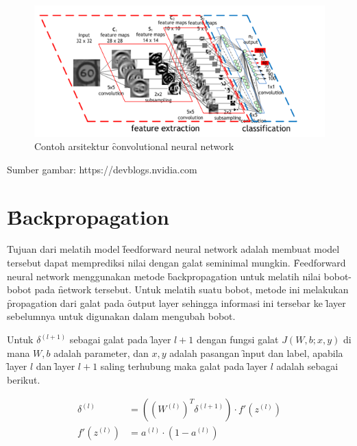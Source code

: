 \begin{figure}
	\centering
	\includegraphics[width=1\textwidth,height=0.45\textwidth]
	{pics/cnnlayers.png}
	\caption{Contoh arsitektur \f{convolutional neural network}}
	\label{fig:cnnlayers}
\end{figure}
\vspace{-1.2cm}
\begin{center}
	{\small Sumber gambar: https://devblogs.nvidia.com}
\end{center}
\section{\f{Backpropagation}}
Tujuan dari melatih model \f{feedforward neural network} adalah membuat model tersebut dapat memprediksi nilai dengan galat seminimal mungkin. \f{Feedforward neural network} menggunakan metode \f{backpropagation} untuk melatih nilai bobot-bobot pada \f{network} tersebut. Untuk melatih suatu bobot, metode ini melakukan \f{propagation} dari galat pada \f{output layer} sehingga informasi ini tersebar ke \f{layer} sebelumnya untuk digunakan dalam mengubah bobot.

Untuk $\delta^{(l+1)}$ sebagai galat pada \f{layer} $l+1$ dengan fungsi galat $J(W,b;x,y)$ di mana $W,b$ adalah parameter, dan $x,y$ adalah pasangan \f{input} dan label, apabila \f{layer} $l$ dan \f{layer} $l+1$ saling terhubung maka galat pada \f{layer} $l$ adalah sebagai berikut.


\begin{equation}
\begin{aligned}
\delta^{(l)} &= ((W^{(l)})^{T}\delta^{(l+1)}) \cdot f'(z^{(l)}) \\
f'(z^{(l)}) &= a^{(l)} \cdot (1-a^{(l)})
\end{aligned}
\end{equation}

